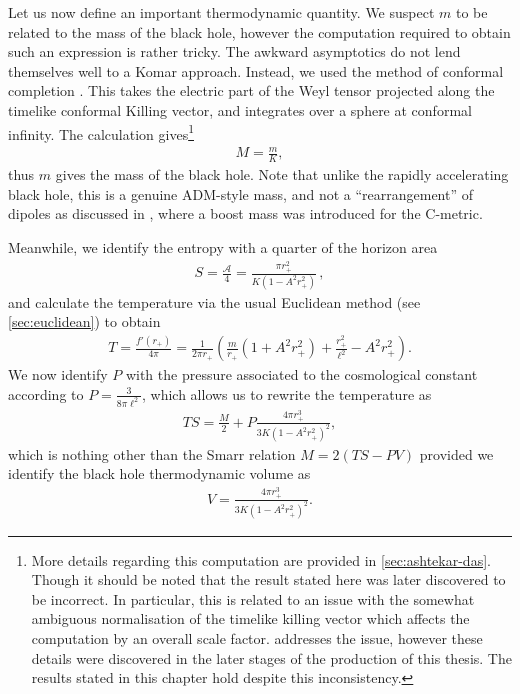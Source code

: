 \documentclass[
twoside,
openright,
frontopenright,
]{dmathesis}
\begin{document}
Let us now define an important thermodynamic quantity. We suspect $m$ to be
related to the mass of the black hole, however the computation required to
obtain such an expression is rather tricky. The awkward asymptotics do not lend
themselves well to a Komar approach. Instead, we used the method of conformal
completion \cite{Ashtekar:1984zz, Ashtekar:1999jx, Das:2000cu}. This takes the
electric part of the Weyl tensor projected along the timelike conformal Killing
vector, and integrates over a sphere at conformal infinity. The calculation
gives\footnote{More details regarding this computation are provided in
  \cref{sec:ashtekar-das}. Though it should be noted that the result stated here
  was later discovered to be incorrect. In particular, this is related to an
  issue with the somewhat ambiguous normalisation of the timelike killing vector
  which affects the computation by an overall scale factor. 
  addresses the issue, however these details were discovered in the later stages
  of the production of this thesis. The results stated in this chapter hold
  despite this inconsistency.}
\begin{align}
  M = \frac{m}{K},
  \label{eq:massAcc}
\end{align}
thus $m$ gives the mass of the black hole. Note that unlike the rapidly
accelerating black hole, this is a genuine ADM-style mass, and not a
``rearrangement'' of dipoles as discussed in \cite{Dutta:2005iy}, where a boost
mass was introduced for the C-metric.

Meanwhile, we identify the entropy with a quarter of the horizon 
area 
\begin{align}
  \label{eq:entropyFT}
S=\frac{\mathcal{A}}{4}=\frac{\pi r_+^2}{K(1-A^2r_+^2)}\,,
\end{align}
and calculate the temperature via the usual Euclidean method (see
\cref{sec:euclidean}) to obtain
\begin{align}\label{eq:Tuncharged}
T=\frac{f'(r_+)}{4\pi} = \frac{1}{2\pi r_+}\left(\frac{m}{r_+}\left(1+A^2r_+^2
\right) + \frac{r_+^2}{\ell^2} - A^2 r_+^2\right).
\end{align}
We now identify $P$ with the pressure associated to the cosmological constant
according to $P=\frac{3}{8\pi \ell^2}$, which allows us to rewrite the
temperature as
\begin{align}
TS = \frac{M}{2}+ P \frac{4\pi r_+^3}{3K (1-A^2r_+^2)^2},
\end{align}
which is nothing other than the Smarr relation $M= 2(TS - PV)$ provided we
identify the black hole thermodynamic volume as
\begin{align}\label{eq:Vuncharged}
V=\frac{4\pi r_+^3}{3K(1-A^2r_+^2)^2}.
\end{align}
\end{document}
